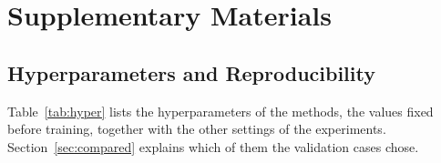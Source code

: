 \chapter{Supplementary Materials}

\section{Hyperparameters and Reproducibility}
\label{app:hyper}
Table~\ref{tab:hyper} lists the hyperparameters of the methods, the values fixed before training,
together with the other settings of the experiments. Section~\ref{sec:compared} explains which of
them the validation cases chose.

